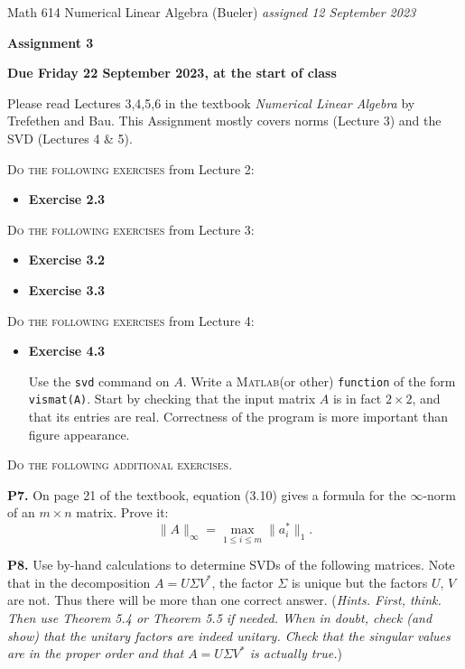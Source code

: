 \documentclass[12pt]{amsart}
\newcommand{\prob}[1]{\bigskip\noindent\textbf{#1.}\quad }
\newcommand{\Matlab}{\textsc{Matlab}\xspace}
\begin{document}
\scriptsize \noindent Math 614 Numerical Linear Algebra (Bueler) \hfill \emph{assigned 12 September 2023}
\normalsize\medskip

\Large\centerline{\textbf{Assignment 3}}
\large
\medskip

\centerline{\textbf{Due Friday 22 September 2023, at the start of class}}
\medskip
\normalsize

\thispagestyle{empty}

\bigskip
\noindent Please read Lectures 3,4,5,6 in the textbook \emph{Numerical Linear Algebra} by Trefethen and Bau.  This Assignment mostly covers norms (Lecture 3) and the SVD (Lectures 4 \& 5).

\bigskip
\noindent \textsc{Do the following exercises} from Lecture 2:

\begin{itemize}
\item \textbf{Exercise 2.3}
\end{itemize}

\bigskip
\noindent \textsc{Do the following exercises} from Lecture 3:

\begin{itemize}
\item \textbf{Exercise 3.2}
\item \textbf{Exercise 3.3}
\end{itemize}

\bigskip
\noindent \textsc{Do the following exercises} from Lecture 4:

\begin{itemize}
\item \textbf{Exercise 4.3}  \qquad \begin{minipage}[t]{0.68\textwidth}
Use the \texttt{svd} command on $A$.  Write a \Matlab (or other) \texttt{function} of the form \texttt{vismat(A)}.  Start by checking that the input matrix $A$ is in fact $2\times 2$, and that its entries are real.  Correctness of the program is more important than figure appearance.
\end{minipage}
\end{itemize}


\bigskip
\noindent \textsc{Do the following additional exercises.}

\prob{P7}  On page 21 of the textbook, equation (3.10) gives a formula for the $\infty$-norm of an $m\times n$ matrix.  Prove it:
    $$\|A\|_\infty = \max_{1\le i \le m} \|a_i^*\|_1.$$

\prob{P8}  Use by-hand calculations to determine SVDs of the following matrices.  Note that in the decomposition $A = U \Sigma V^*$, the factor $\Sigma$ is unique but the factors $U$, $V$ are not.  Thus there will be more than one correct answer.  (\emph{Hints.  First, think.  Then use Theorem 5.4 or Theorem 5.5 if needed.  When in doubt, check (and show) that the unitary factors are indeed unitary.  Check that the singular values are in the proper order and that $A = U \Sigma V^*$ is actually true.})
\end{document}
